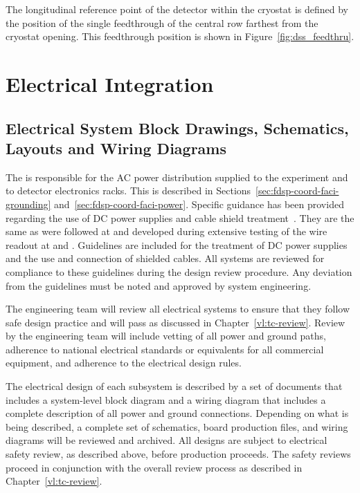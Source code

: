 The longitudinal reference point of the detector within the cryostat
is defined by the position of the single feedthrough of the central row
farthest from the cryostat opening. This feedthrough position
is shown in Figure~\ref{fig:dss_feedthru}.



\section{Electrical Integration}
\label{sec:fdsp-Integ-electrical}


\subsection{Electrical System Block Drawings, Schematics, Layouts and Wiring Diagrams}
\label{sec:fdsp-coord-electrical}


The  is responsible for the AC power distribution supplied to
the experiment and to detector electronics racks.  This is described
in Sections~\ref{sec:fdsp-coord-faci-grounding}
and~\ref{sec:fdsp-coord-faci-power}.  Specific guidance has been
provided regarding the use of DC power supplies and cable shield
treatment~\cite{bib:cernedms2095958}. 
They are the same as were
followed at  and developed during extensive testing
of the  wire readout at  and .
Guidelines are included for the treatment of DC power supplies and the
use and connection of shielded cables.  All systems are reviewed for
compliance to these guidelines during the design review procedure.
Any deviation from the guidelines must be noted and approved by system
engineering.

The  engineering team will review all electrical systems to ensure that they
follow safe design practice and will pass  as discussed in
Chapter~\ref{vl:tc-review}.  Review by the  engineering team will include vetting
of all power and ground paths, adherence to national electrical
standards or equivalents for all commercial equipment, and adherence
to the  electrical design rules.

The electrical design of each subsystem is described by a set of
documents that includes a system-level block diagram and a wiring
diagram that includes a complete description of all power and ground
connections.  Depending on what is being described, a complete set of
schematics, board production files, and wiring diagrams will be
reviewed and archived.  All designs are subject to electrical safety
review, as described above, before production proceeds. The safety
reviews proceed in conjunction with the overall review process as
described in Chapter~\ref{vl:tc-review}.

